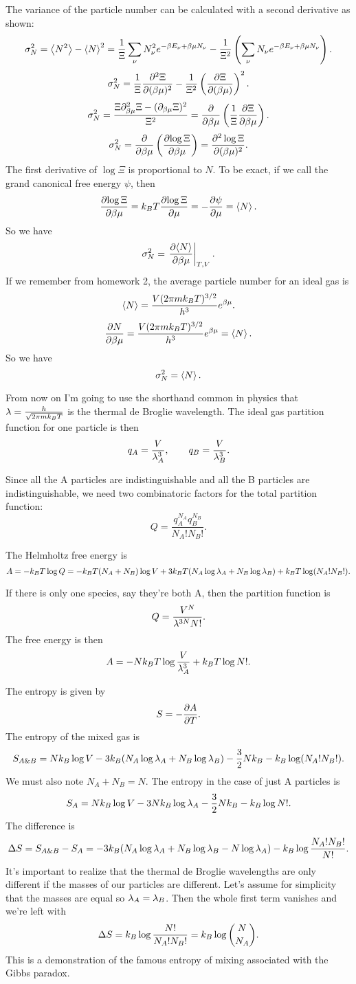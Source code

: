 \documentclass[12pt]{article}
\begin{document}
 The variance of the particle number can be calculated with a second derivative as shown:
\[ \sigma_N^2 = \left \langle N^2 \right \rangle - \left \langle N \right \rangle^2 = \frac{1}{\Xi} \sum_\nu N_\nu^2 e^{-\beta E_\nu + \beta \mu N_\nu} - \frac{1}{\Xi^2} \left(\sum_\nu N_\nu e^{-\beta E_\nu + \beta \mu N_\nu} \right).\]
\[ \sigma_N^2 = \frac{1}{\Xi} \frac{\partial {^2\Xi}}{\partial {(\beta\mu)^2}} - \frac{1}{\Xi^2} \left( \frac{\partial {\Xi}}{\partial {(\beta\mu)}} \right)^2.\]
\[ \sigma_N^2 = \frac{\Xi \partial_{\beta\mu}^2 \Xi - (\partial_{\beta\mu} \Xi)^2}{\Xi^2} = \frac{\partial {}}{\partial {\beta\mu}}\left( \frac{1}{\Xi} \frac{\partial {\Xi}}{\partial {\beta\mu}}\right).\]
\[ \sigma_N^2 = \frac{\partial {}}{\partial {\beta\mu}} \left(\frac{\partial {\log \Xi}}{\partial {\beta\mu}}\right) = \frac{\partial {^2\log\Xi}}{\partial {(\beta\mu)^2}}.\]
The first derivative of $\log\Xi$ is proportional to $N$. To be exact, if we call the grand canonical free energy $\psi$, then
\[ \frac{\partial {\log \Xi}}{\partial {\beta\mu}} = k_BT \frac{\partial {\log \Xi}}{\partial {\mu}} = -\frac{\partial {\psi}}{\partial {\mu}} = \left \langle N \right \rangle.\]
So we have
\[ \sigma_N^2 = \left.\frac{\partial{\left \langle N \right \rangle}}{\partial{\beta\mu}}\right|_{T,V}.\]
If we remember from homework 2, the average particle number for an ideal gas is
\[ \left \langle N \right \rangle = \frac{V(2\pi m k_BT)^{3/2}}{h^3}  e^{\beta\mu}.\]
\[ \frac{\partial {N}}{\partial {\beta\mu}} = \frac{V(2\pi m k_BT)^{3/2}}{h^3} e^{\beta\mu} = \left \langle N \right \rangle.\]
So we have
\[ \sigma_N^2 = \left \langle N \right \rangle.\]

\hrulefill

 From now on I'm going to use the shorthand common in physics that $\lambda = \frac{h}{\sqrt{2\pi mk_BT}}$ is the thermal de Broglie wavelength. The ideal gas partition function for one particle is then
\[ q_A = \frac{V}{\lambda_A^3}, \qquad q_B = \frac{V}{\lambda_B^3}.\]

 Since all the A particles are indistinguishable and all the B particles are indistinguishable, we need two combinatoric factors for the total partition function:
\[ Q = \frac{q_A^{N_A} q_B^{N_B}}{N_A! N_B!}.\]

 The Helmholtz free energy is
\[ A = -k_BT\log Q = -k_BT(N_A+N_B)\log V + 3k_BT (N_A\log \lambda_A + N_B \log \lambda_B) + k_BT\log(N_A!N_B!).\]

 If there is only one species, say they're both A, then the partition function is
\[ Q = \frac{V^N}{\lambda^{3N} N!}.\]
The free energy is then
\[ A = -Nk_BT\log \frac{V}{\lambda_A^3} + k_BT\log N!.\]

 The entropy is given by
\[ S = -\frac{\partial {A}}{\partial {T}}.\]
The entropy of the mixed gas is
\[ S_{A\&B} = Nk_B\log V - 3k_B(N_A\log\lambda_A + N_B\log\lambda_B) - \frac{3}{2}Nk_B - k_B\log(N_A!N_B!).\]
We must also note $N_A+N_B = N$. The entropy in the case of just A particles is
\[ S_{A} = Nk_B\log V - 3Nk_B\log\lambda_A - \frac{3}{2}Nk_B - k_B\log N!.\]
The difference is
\[ \Delta S = S_{A\&B} - S_{A} = -3k_B (N_A\log\lambda_A + N_B\log \lambda_B - N\log \lambda_A) -k_B\log\frac{N_A!N_B!}{N!}.\]
It's important to realize that the thermal de Broglie wavelengths are only different if the masses of our particles are different. Let's assume for simplicity that the masses are equal so $\lambda_A = \lambda_B$. Then the whole first term vanishes and we're left with
\[ \Delta S = k_B \log \frac{N!}{N_A!N_B!} = k_B \log {N \choose N_A}.\]
This is a demonstration of the famous entropy of mixing associated with the Gibbs paradox.
\end{document}
